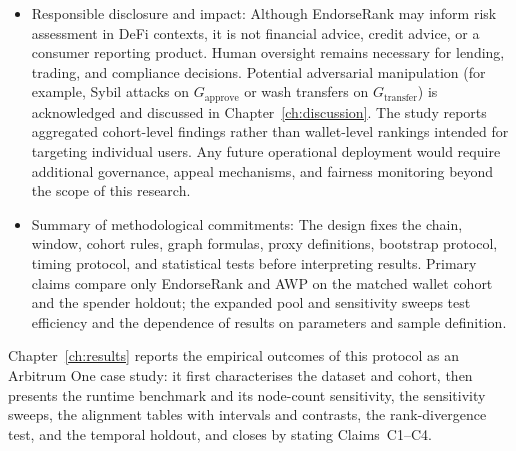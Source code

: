 \begin{itemize}
\item{}\label{sub:responsible-disclosure}
  Responsible disclosure and impact: Although EndorseRank may inform risk assessment in DeFi contexts, it is not financial advice, credit advice, or a consumer reporting product. Human oversight remains necessary for lending, trading, and compliance decisions. Potential adversarial manipulation (for example, Sybil attacks on $G_{\mathrm{approve}}$ or wash transfers on $G_{\mathrm{transfer}}$) is acknowledged and discussed in Chapter~\ref{ch:discussion}. The study reports aggregated cohort-level findings rather than wallet-level rankings intended for targeting individual users. Any future operational deployment would require additional governance, appeal mechanisms, and fairness monitoring beyond the scope of this research.


\item{}\label{sub:methodological-commitments}
  Summary of methodological commitments: The design fixes the chain, window, cohort rules, graph formulas, proxy definitions, bootstrap protocol, timing protocol, and statistical tests before interpreting results. Primary claims compare only EndorseRank and AWP on the matched wallet cohort and the spender holdout; the expanded pool and sensitivity sweeps test efficiency and the dependence of results on parameters and sample definition.
\end{itemize}

Chapter~\ref{ch:results} reports the empirical outcomes of this protocol as an Arbitrum One case study: it first characterises the dataset and cohort, then presents the runtime benchmark and its node-count sensitivity, the sensitivity sweeps, the alignment tables with intervals and contrasts, the rank-divergence test, and the temporal holdout, and closes by stating Claims~C1--C4.
